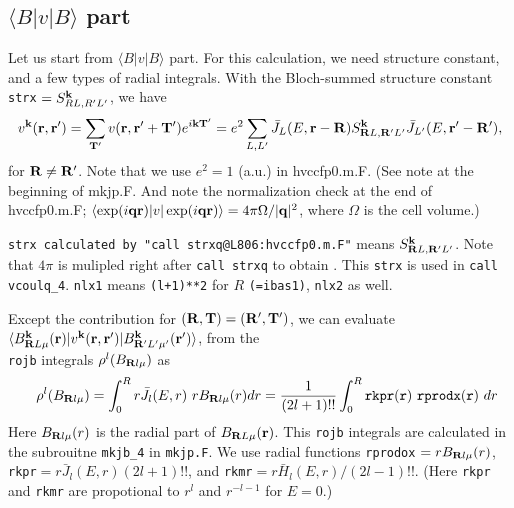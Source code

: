 \documentclass[a4paper,10pt,fleqn]{article}
\newcommand{\bfq}{{\bf q}}
\newcommand{\bfk}{{\bf k}}
\newcommand{\bfr}{{\bf r}}
\newcommand{\bfT}{{\bf T}}
\newcommand{\bfR}{{\bf R}}
\begin{document}
%
%
%


\subsection{$\langle B|v|B \rangle$ part}
\label{sec:bvbpart}
Let us start from $\langle B|v|B \rangle$ part.
For this calculation, we need structure constant, and a few types of
radial integrals.
With the Bloch-summed structure constant \verb!strx!
$=S^\bfk_{RL,R'L'}$, we have
\begin{eqnarray}
v^\bfk(\bfr,\bfr')
=\sum_{\bfT'} v(\bfr,\bfr'+\bfT') e^{i \bfk \bfT'}
=e^2 \sum_{L,L'} 
{\bar{J}_L(E,\bfr-\bfR)}
S^{\bfk}_{\bfR{L},\bfR'{L'}}
{\bar{J}_{L'}(E,\bfr'-\bfR')},
\label{eq:vkbb}
\end{eqnarray}
for $\bfR \ne \bfR'$.
Note that we use $e^2=1$ (a.u.) in hvccfp0.m.F.
(See note at the beginning of mkjp.F. And note the normalization check
at the end of hvccfp0.m.F; $\langle \exp(i \bfq \bfr) |v |\exp(i \bfq \bfr)\rangle=4\pi \Omega/|\bfq|^2$, where $\Omega$ is the cell volume.)

\verb#strx calculated by "call strxq@L806:hvccfp0.m.F"# 
means $S^\bfk_{\bfR{L},\bfR'L'}$. Note that $4 \pi$ is mulipled right
after \verb#call strxq# to obtain \verb@strx@. 
This \verb!strx! is used in  \verb!call vcoulq_4!. 
\verb#nlx1# means \verb#(l+1)**2# for $R$ 
\verb#(=ibas1)#, \verb#nlx2# as well.

Except the contribution for $(\bfR,\bfT)=(\bfR',\bfT')$,
we can evaluate
$\langle B^\bfk_{\bfR{L}\mu}(\bfr)|v^\bfk(\bfr,\bfr')|B^\bfk_{\bfR'{L'}\mu'}(\bfr') \rangle$, from the\\ \verb#rojb# integrals $\rho^l(B_{\bfR{l}\mu})$  as
\begin{eqnarray}
&&\rho^l(B_{\bfR{l}\mu})=
\int_0^{R} r\bar{J}_l(E,r) \ r B_{\bfR{l}\mu}(r)  dr
= \frac{1}{(2l+1)!!}\int_0^{R} {\tt rkpr(r) \ rprodx(r)} \ dr
\end{eqnarray}
Here $B_{\bfR{l}\mu}(r)$ is the radial part of $B_{\bfR{L}\mu}(\bfr)$.
This \verb!rojb! integrals are calculated in 
the subrouitne \verb!mkjb_4! in \verb#mkjp.F#.
We use radial functions 
\verb!rprodox! $=r B_{\bfR{l}\mu}(r)$, 
\verb!rkpr!$=r\bar{J}_l(E,r)(2l+1)!!$, 
and \verb!rkmr!$=r\bar{H}_l(E,r)/(2l-1)!!$.
(Here \verb!rkpr! and \verb!rkmr! are propotional to
$r^l$ and $r^{-l-1}$ for $E =0$.)
\end{document}
